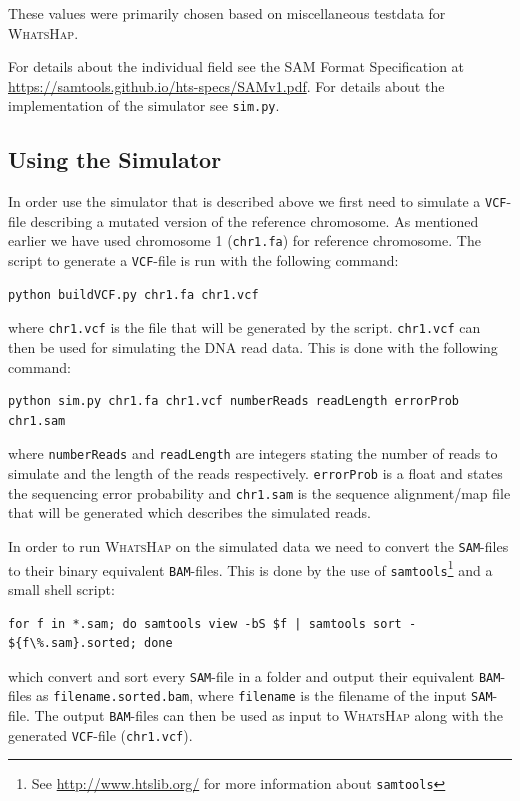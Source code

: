 \documentclass[10pt,a4paper]{article}
\begin{document}
These values were primarily chosen based on miscellaneous testdata for \textsc{WhatsHap}.

For details about the individual field see the SAM Format Specification at \url{https://samtools.github.io/hts-specs/SAMv1.pdf}. For details about the implementation of the simulator see \texttt{sim.py}.

\subsection{Using the Simulator}
In order use the simulator that is described above we first need to simulate a \texttt{VCF}-file describing a mutated version of the reference chromosome. As mentioned earlier we have used chromosome 1 (\texttt{chr1.fa}) for reference chromosome. The script to generate a \texttt{VCF}-file is run with the following command:
\begin{lstlisting}
python buildVCF.py chr1.fa chr1.vcf
\end{lstlisting}
where \texttt{chr1.vcf} is the file that will be generated by the script. \texttt{chr1.vcf} can then be used for simulating the DNA read data. This is done with the following command:
\begin{lstlisting}
python sim.py chr1.fa chr1.vcf numberReads readLength errorProb chr1.sam
\end{lstlisting}
where \texttt{numberReads} and \texttt{readLength} are integers stating the number of reads to simulate and the length of the reads respectively. \texttt{errorProb} is a float and states the sequencing error probability and \texttt{chr1.sam} is the sequence alignment/map file that will be generated which describes the simulated reads.

In order to run \textsc{WhatsHap} on the simulated data we need to convert the \texttt{SAM}-files to their binary equivalent \texttt{BAM}-files. This is done by the use of \texttt{samtools}\footnote{See \url{http://www.htslib.org/} for more information about \texttt{samtools}} and a small shell script:
\begin{lstlisting}
for f in *.sam; do samtools view -bS $f | samtools sort - ${f\%.sam}.sorted; done
\end{lstlisting}
which convert and sort every \texttt{SAM}-file in a folder and output their equivalent \texttt{BAM}-files as \texttt{filename.sorted.bam}, where \texttt{filename} is the filename of the input \texttt{SAM}-file. The output \texttt{BAM}-files can then be used as input to \textsc{WhatsHap} along with the generated \texttt{VCF}-file (\texttt{chr1.vcf}).
\end{document}
